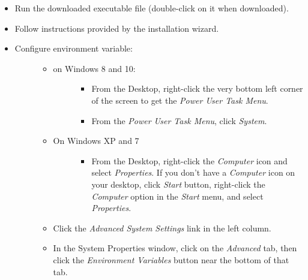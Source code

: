\documentclass[letterpaper,10pt,english]{sphinxmanual}
\begin{document}
\begin{itemize}
\item {} 
Run the downloaded executable file (double-click on it when downloaded).

\item {} 
Follow instructions provided by the installation wizard.

\item {} \begin{description}
\item[{Configure  environment variable:}] \leavevmode\begin{itemize}
\item {} \begin{description}
\item[{on Windows 8 and 10:}] \leavevmode\begin{itemize}
\item {} 
From the Desktop, right-click the very bottom left corner of the screen to get
the \emph{Power User Task Menu}.

\item {} 
From the \emph{Power User Task Menu}, click \emph{System}.

\end{itemize}

\end{description}

\item {} \begin{description}
\item[{On Windows XP and 7}] \leavevmode\begin{itemize}
\item {} 
From the Desktop, right-click the \emph{Computer} icon and select \emph{Properties}. If you
don't have a \emph{Computer} icon on your desktop, click \emph{Start} button, right-click the
\emph{Computer} option in the \emph{Start} menu, and select \emph{Properties}.

\end{itemize}

\end{description}

\item {} 
Click the \emph{Advanced System Settings} link in the left column.

\item {} 
In the System Properties window, click on the \emph{Advanced} tab,
then click the \emph{Environment Variables} button near the bottom of that tab.


\end{itemize}
\end{description}
\end{itemize}
\end{document}
